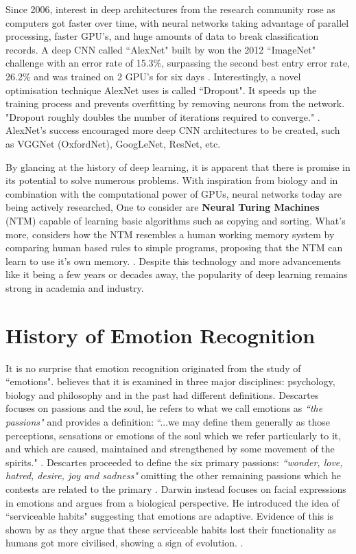 \documentclass[report, 11pt, oneside]{dissertation}
\begin{document}
Since 2006, interest in deep architectures from the research community rose as computers got faster over time, with neural networks taking advantage of parallel processing, faster GPU’s, and huge amounts of data to break classification records. A deep CNN called ``AlexNet" built by \citeauthor{Krizhevsky2012} won the 2012 ``ImageNet" challenge with an error rate of 15.3\%, surpassing the second best entry error rate, 26.2\% and was trained on 2 GPU's for six days \citeyearpar[1]{Krizhevsky2012}. Interestingly, a novel optimisation technique AlexNet uses is called ``Dropout". It speeds up the training process and prevents overfitting by removing neurons from the network. "Dropout roughly doubles the number of iterations required to converge." \citep[6]{Krizhevsky2012}. AlexNet's success encouraged more deep CNN architectures to be created, such as VGGNet (OxfordNet), GoogLeNet, ResNet, etc.

By glancing at the history of deep learning, it is apparent that there is promise in its potential to solve numerous problems. With inspiration from biology and in combination with the computational power of GPUs, neural networks today are being actively researched, One to consider are \textbf{Neural Turing Machines} (NTM) capable of learning basic algorithms such as copying and sorting. What’s more, \citeauthor{DBLP:journals/corr/GravesWD14} considers how the NTM resembles a human working memory system by comparing human based rules to simple programs, proposing that the NTM can learn to use it’s own memory. \citeyearpar[2]{DBLP:journals/corr/GravesWD14}. Despite this technology and more advancements like it being a few years or decades away, the popularity of deep learning remains strong in academia and industry.

\section{History of Emotion Recognition}

It is no surprise that emotion recognition originated from the study of ``emotions". \citeauthor{ERIHCI:911197} believes that it is examined in three major disciplines: psychology, biology and philosophy \citeyearpar[35]{ERIHCI:911197} and in the past had different definitions. Descartes focuses on passions and the soul, he refers to what we call emotions as \textit{``the passions"} and provides a definition: ``...we may define them generally as those perceptions, sensations or emotions of the soul which we refer particularly to it, and which are caused, maintained and strengthened by some movement of the spirits." \citep{descartes_1985}. Descartes proceeded to define the six primary passions: \textit{``wonder, love, hatred, desire, joy and sadness"} omitting the other remaining passions which he contests are related to the primary \citeyearpar[353]{descartes_1985}. Darwin instead focuses on facial expressions in emotions and argues from a biological perspective. He introduced the idea of ``serviceable habits" suggesting that emotions are adaptive. Evidence of this is shown by \citeauthor{hess2009darwin} as they argue that these serviceable habits lost their functionality as humans got more civilised, showing a sign of evolution. \citeyearpar[353]{hess2009darwin}.
\end{document}
